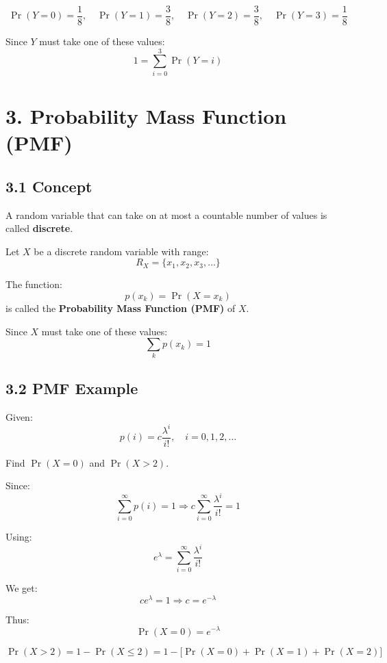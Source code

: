 \documentclass[12pt]{article}
\begin{document}
\[
\Pr(Y=0)=\frac{1}{8}, \quad
\Pr(Y=1)=\frac{3}{8}, \quad
\Pr(Y=2)=\frac{3}{8}, \quad
\Pr(Y=3)=\frac{1}{8}
\]

Since $Y$ must take one of these values:
\[
1 = \sum_{i=0}^{3} \Pr(Y=i)
\]

\section*{3. Probability Mass Function (PMF)}

\subsection*{3.1 Concept}

A random variable that can take on at most a countable number of values is called \textbf{discrete}.

Let $X$ be a discrete random variable with range:
\[
R_X = \{x_1, x_2, x_3, \ldots\}
\]

The function:
\[
p(x_k) = \Pr(X = x_k)
\]
is called the \textbf{Probability Mass Function (PMF)} of $X$.

Since $X$ must take one of these values:
\[
\sum_k p(x_k) = 1
\]

\subsection*{3.2 PMF Example}

Given:
\[
p(i) = c \frac{\lambda^i}{i!}, \quad i = 0,1,2,\ldots
\]

Find $\Pr(X=0)$ and $\Pr(X>2)$.

Since:
\[
\sum_{i=0}^{\infty} p(i) = 1
\Rightarrow
c \sum_{i=0}^{\infty} \frac{\lambda^i}{i!} = 1
\]

Using:
\[
e^{\lambda} = \sum_{i=0}^{\infty} \frac{\lambda^i}{i!}
\]

We get:
\[
c e^{\lambda} = 1 \Rightarrow c = e^{-\lambda}
\]

Thus:
\[
\Pr(X=0) = e^{-\lambda}
\]

\[
\Pr(X>2) = 1 - \Pr(X \le 2)
= 1 - \bigl[\Pr(X=0) + \Pr(X=1) + \Pr(X=2)\bigr]
\]

\vspace{0.5cm}
\end{document}
